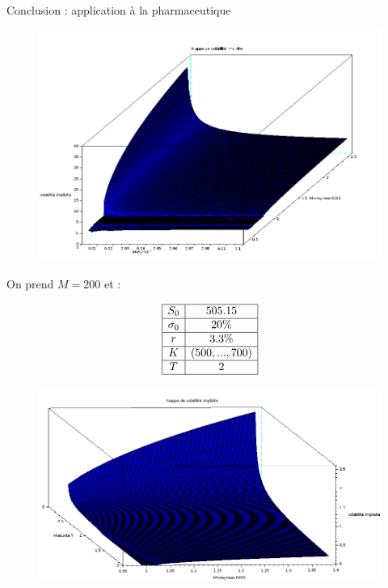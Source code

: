\documentclass[final]{beamer}
\newlength{\onecolwid}
\begin{document}
\begin{frame}[t]
\begin{columns}[t]
\begin{column}{\onecolwid}
\begin{block}{Conclusion : application à la pharmaceutique}
\begin{figure}
  \includegraphics[scale=0.20]{volimpl1.png}
\end{figure}

  On prend $M = 200$ et :

    \[
      \begin{array}{|c|c|}
        \hline
        S_0 & 505.15 \\ \hline
        \sigma_0 & 20\% \\ \hline
        r & 3.3 \% \\ \hline
        K & (500,...,700) \\ \hline
        T & 2 \\ \hline
      \end{array}
    \]
    \begin{figure}
      \vspace{-0.8cm}
      \includegraphics[scale=0.35]{volimpl2.png}
    \end{figure}
\end{block}


\end{column}
\end{columns}
\end{frame}
\end{document}
